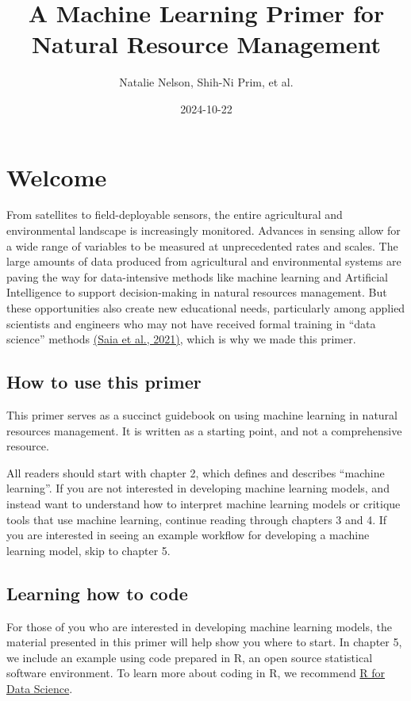 \documentclass[
]{book}
\title{A Machine Learning Primer for Natural Resource Management}
\author{Natalie Nelson, Shih-Ni Prim, et al.}
\date{2024-10-22}
\begin{document}
\maketitle

{
\setcounter{tocdepth}{1}
\tableofcontents
}
\hypertarget{welcome}{%
\chapter{Welcome}\label{welcome}}

From satellites to field-deployable sensors, the entire agricultural and environmental landscape is increasingly monitored. Advances in sensing allow for a wide range of variables to be measured at unprecedented rates and scales. The large amounts of data produced from agricultural and environmental systems are paving the way for data-intensive methods like machine learning and Artificial Intelligence to support decision-making in natural resources management. But these opportunities also create new educational needs, particularly among applied scientists and engineers who may not have received formal training in ``data science'' methods \href{https://doi.org/10.1016/j.ecolmodel.2020.109257}{(Saia et al., 2021)}, which is why we made this primer.

\hypertarget{how-to-use-this-primer}{%
\section{How to use this primer}\label{how-to-use-this-primer}}

This primer serves as a succinct guidebook on using machine learning in natural resources management. It is written as a starting point, and not a comprehensive resource.

All readers should start with chapter 2, which defines and describes ``machine learning''. If you are not interested in developing machine learning models, and instead want to understand how to interpret machine learning models or critique tools that use machine learning, continue reading through chapters 3 and 4. If you are interested in seeing an example workflow for developing a machine learning model, skip to chapter 5.

\hypertarget{learning-how-to-code}{%
\section{Learning how to code}\label{learning-how-to-code}}

For those of you who are interested in developing machine learning models, the material presented in this primer will help show you where to start. In chapter 5, we include an example using code prepared in R, an open source statistical software environment. To learn more about coding in R, we recommend \href{http://r4ds.hadley.nz/}{R for Data Science}.
\end{document}
